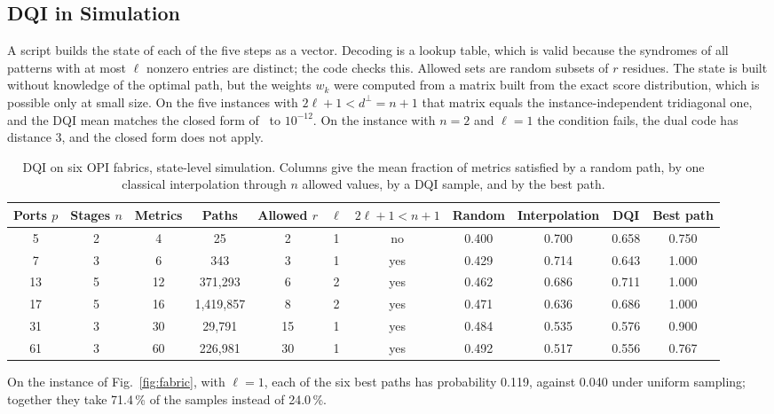 \documentclass[journal]{IEEEtran}
\begin{document}
\subsection{DQI in Simulation}

A script builds the state of each of the five steps as a vector. Decoding is a lookup table, which is valid because the syndromes of all patterns with at most $\ell$ nonzero entries are distinct; the code checks this. Allowed sets are random subsets of $r$ residues. The state is built without knowledge of the optimal path, but the weights $w_{k}$ were computed from a matrix built from the exact score distribution, which is possible only at small size. On the five instances with $2\ell+1<d^{\perp}=n+1$ that matrix equals the instance-independent tridiagonal one, and the DQI mean matches the closed form of~\cite{jordan2025} to $10^{-12}$. On the instance with $n=2$ and $\ell=1$ the condition fails, the dual code has distance 3, and the closed form does not apply.

\begin{table}[t]
\caption{DQI on six OPI fabrics, state-level simulation. Columns give the mean fraction of metrics satisfied by a random path, by one classical interpolation through $n$ allowed values, by a DQI sample, and by the best path.}
\label{tab:dqi}
\centering
\footnotesize
\begin{tabular}{ccccccccccc}
\hline \hline
\textbf{Ports $p$} & \textbf{Stages $n$} & \textbf{Metrics} & \textbf{Paths} & \textbf{Allowed $r$} & \textbf{$\ell$} & \textbf{$2\ell+1<n+1$} & \textbf{Random} & \textbf{Interpolation} & \textbf{DQI} & \textbf{Best path} \\
\hline
5 & 2 & 4 & 25 & 2 & 1 & no & 0.400 & 0.700 & 0.658 & 0.750 \\
7 & 3 & 6 & 343 & 3 & 1 & yes & 0.429 & 0.714 & 0.643 & 1.000 \\
13 & 5 & 12 & 371{,}293 & 6 & 2 & yes & 0.462 & 0.686 & 0.711 & 1.000 \\
17 & 5 & 16 & 1{,}419{,}857 & 8 & 2 & yes & 0.471 & 0.636 & 0.686 & 1.000 \\
31 & 3 & 30 & 29{,}791 & 15 & 1 & yes & 0.484 & 0.535 & 0.576 & 0.900 \\
61 & 3 & 60 & 226{,}981 & 30 & 1 & yes & 0.492 & 0.517 & 0.556 & 0.767 \\
\hline \hline
\end{tabular}
\end{table}

On the instance of Fig.~\ref{fig:fabric}, with $\ell = 1$, each of the six best paths has probability 0.119, against 0.040 under uniform sampling; together they take 71.4\,\% of the samples instead of 24.0\,\%.
\end{document}
